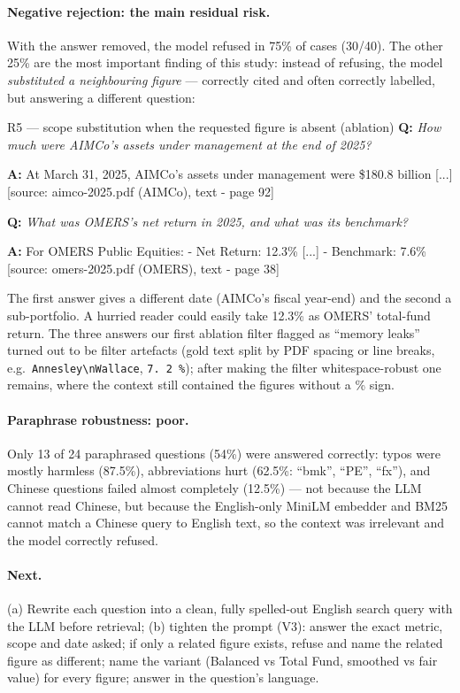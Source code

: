 \documentclass[11pt,a4paper]{article}
\newcommand{\Q}[1]{\noindent\textbf{Q:} \textit{#1}\par\smallskip}
\newcommand{\A}[1]{\noindent\textbf{A:} {\small\ttfamily #1}\par}
\begin{document}
\paragraph{Negative rejection: the main residual risk.} With the answer removed, the model refused in 75\% of cases
(30/40). The other 25\% are the most important finding of this study: instead of refusing, the model
\emph{substituted a neighbouring figure} --- correctly cited and often correctly labelled, but answering a different
question:

\begin{qa}{R5 --- scope substitution when the requested figure is absent (ablation)}
\Q{How much were AIMCo's assets under management at the end of 2025?}
\A{At March 31, 2025, AIMCo's assets under management were \$180.8 billion [...] [source: aimco-2025.pdf (AIMCo), text - page 92]}
\medskip
\Q{What was OMERS's net return in 2025, and what was its benchmark?}
\A{For OMERS Public Equities: - Net Return: 12.3\% [...] - Benchmark: 7.6\% [source: omers-2025.pdf (OMERS), text - page 38]}
\end{qa}
The first answer gives a different date (AIMCo's fiscal year-end) and the second a sub-portfolio. A hurried reader
could easily take 12.3\% as OMERS' total-fund return. The three answers our first ablation filter flagged as
``memory leaks'' turned out to be filter artefacts (gold text split by PDF spacing or line breaks, e.g.\
\texttt{Annesley\textbackslash nWallace}, \texttt{7. 2 \%}); after making the filter whitespace-robust one remains, where
the context still contained the figures without a \% sign.

\paragraph{Paraphrase robustness: poor.} Only 13 of 24 paraphrased questions (54\%) were answered correctly:
typos were mostly harmless (87.5\%), abbreviations hurt (62.5\%: ``bmk'', ``PE'', ``fx''), and Chinese questions
failed almost completely (12.5\%) --- not because the LLM cannot read Chinese, but because the English-only MiniLM
embedder and BM25 cannot match a Chinese query to English text, so the context was irrelevant and the model correctly
refused.

\paragraph{Next.} (a) Rewrite each question into a clean, fully spelled-out English search query with the LLM before
retrieval; (b) tighten the prompt (V3): answer the exact metric, scope and date asked; if only a related figure exists,
refuse and name the related figure as different; name the variant (Balanced vs Total Fund, smoothed vs fair value)
for every figure; answer in the question's language.
\end{document}
